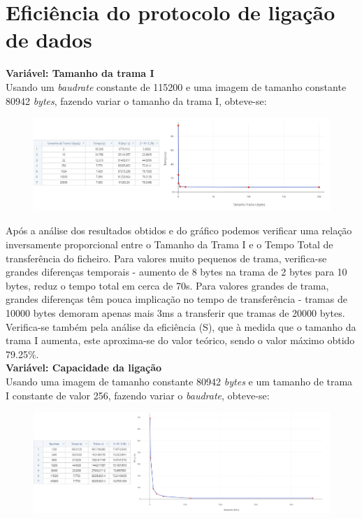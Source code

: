 \documentclass[a4paper, 11pt]{article}
\begin{document}
\section{Eficiência do protocolo de ligação de dados}

\textbf{Variável: Tamanho da trama I}\\
Usando um \textit{baudrate} constante de 115200 e uma imagem de tamanho constante 80942 \textit{bytes}, fazendo variar o tamanho da trama I, obteve-se:
\begin{figure}[h!]
\begin{center}
\includegraphics[scale=0.4]{images/TamanhoTrama.png}
\end{center}
\end{figure}

Após a análise dos resultados obtidos e do gráfico podemos verificar uma relação inversamente proporcional entre o Tamanho da Trama I e o Tempo Total de transferência do ficheiro. Para valores muito pequenos de trama, verifica-se grandes diferenças temporais - aumento de 8 bytes na trama de 2 bytes para 10 bytes, reduz o tempo total em cerca de 70s. Para valores grandes de trama, grandes diferenças têm pouca implicação no tempo de transferência - tramas de 10000 bytes demoram apenas mais  3ms a transferir que tramas de 20000 bytes. Verifica-se também pela análise da eficiência (S), que à medida que o tamanho da trama I aumenta, este aproxima-se do valor teórico, sendo o valor máximo obtido 79.25\%.\\

\textbf{Variável: Capacidade da ligação}\\
Usando uma imagem de tamanho constante 80942 \textit{bytes} e um tamanho de trama I constante de valor 256, fazendo variar o \textit{baudrate}, obteve-se:
\begin{figure}[h!]
\begin{center}
\includegraphics[scale=0.35]{images/Baudrate.png}
\end{center}
\end{figure}
\end{document}
